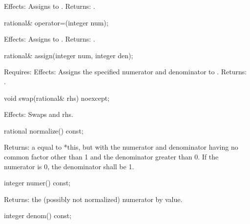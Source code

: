 \begin{itemdescr}
Effects: Assigns  to .
Returns: .
\end{itemdescr}

\begin{itemdecl}
rational& operator=(integer num);
\end{itemdecl}

\begin{itemdescr}
Effects: Assigns  to .
Returns: .
\end{itemdescr}

\begin{itemdecl}
rational& assign(integer num, integer den);
\end{itemdecl}

\begin{itemdescr}
Requires: 
Effects: Assigns the specified numerator and denominator to .
Returns: .
\end{itemdescr}

\begin{itemdecl}
void swap(rational& rhs) noexcept;
\end{itemdecl}

\begin{itemdescr}
Effects: Swaps  and rhs.
\end{itemdescr}

\begin{itemdecl}
rational normalize() const;
\end{itemdecl}

\begin{itemdescr}
Returns: a  equal to *this, but with the numerator and denominator having no common factor other than 1 and the denominator greater than 0. If the numerator is 0, the denominator shall be 1.
\end{itemdescr}

\begin{itemdecl}
integer numer() const;
\end{itemdecl}

\begin{itemdescr}
Returns: the (possibly not normalized) numerator by value.
\end{itemdescr}

\begin{itemdecl}
integer denom() const;
\end{itemdecl}

